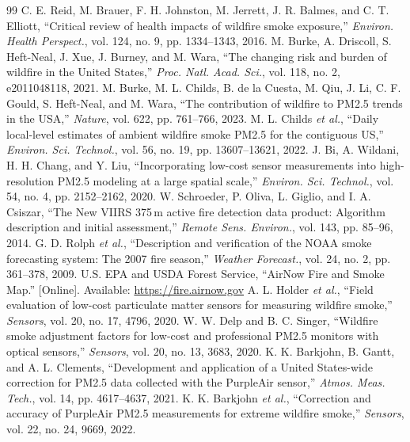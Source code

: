 \documentclass[10pt,journal,compsoc]{IEEEtran}
\begin{document}

\begin{thebibliography}{99}
 C. E. Reid, M. Brauer, F. H. Johnston, M. Jerrett, J. R. Balmes, and C. T. Elliott, ``Critical review of health impacts of wildfire smoke exposure,'' \emph{Environ. Health Perspect.}, vol. 124, no. 9, pp. 1334--1343, 2016.
 M. Burke, A. Driscoll, S. Heft-Neal, J. Xue, J. Burney, and M. Wara, ``The changing risk and burden of wildfire in the United States,'' \emph{Proc. Natl. Acad. Sci.}, vol. 118, no. 2, e2011048118, 2021.
 M. Burke, M. L. Childs, B. de la Cuesta, M. Qiu, J. Li, C. F. Gould, S. Heft-Neal, and M. Wara, ``The contribution of wildfire to PM2.5 trends in the USA,'' \emph{Nature}, vol. 622, pp. 761--766, 2023.
 M. L. Childs \emph{et al.}, ``Daily local-level estimates of ambient wildfire smoke PM2.5 for the contiguous US,'' \emph{Environ. Sci. Technol.}, vol. 56, no. 19, pp. 13607--13621, 2022.
 J. Bi, A. Wildani, H. H. Chang, and Y. Liu, ``Incorporating low-cost sensor measurements into high-resolution PM2.5 modeling at a large spatial scale,'' \emph{Environ. Sci. Technol.}, vol. 54, no. 4, pp. 2152--2162, 2020.
 W. Schroeder, P. Oliva, L. Giglio, and I. A. Csiszar, ``The New VIIRS 375\,m active fire detection data product: Algorithm description and initial assessment,'' \emph{Remote Sens. Environ.}, vol. 143, pp. 85--96, 2014.
 G. D. Rolph \emph{et al.}, ``Description and verification of the NOAA smoke forecasting system: The 2007 fire season,'' \emph{Weather Forecast.}, vol. 24, no. 2, pp. 361--378, 2009.
 U.S. EPA and USDA Forest Service, ``AirNow Fire and Smoke Map.'' [Online]. Available: \url{https://fire.airnow.gov}
 A. L. Holder \emph{et al.}, ``Field evaluation of low-cost particulate matter sensors for measuring wildfire smoke,'' \emph{Sensors}, vol. 20, no. 17, 4796, 2020.
 W. W. Delp and B. C. Singer, ``Wildfire smoke adjustment factors for low-cost and professional PM2.5 monitors with optical sensors,'' \emph{Sensors}, vol. 20, no. 13, 3683, 2020.
 K. K. Barkjohn, B. Gantt, and A. L. Clements, ``Development and application of a United States-wide correction for PM2.5 data collected with the PurpleAir sensor,'' \emph{Atmos. Meas. Tech.}, vol. 14, pp. 4617--4637, 2021.
 K. K. Barkjohn \emph{et al.}, ``Correction and accuracy of PurpleAir PM2.5 measurements for extreme wildfire smoke,'' \emph{Sensors}, vol. 22, no. 24, 9669, 2022.

\end{thebibliography}
\end{document}
